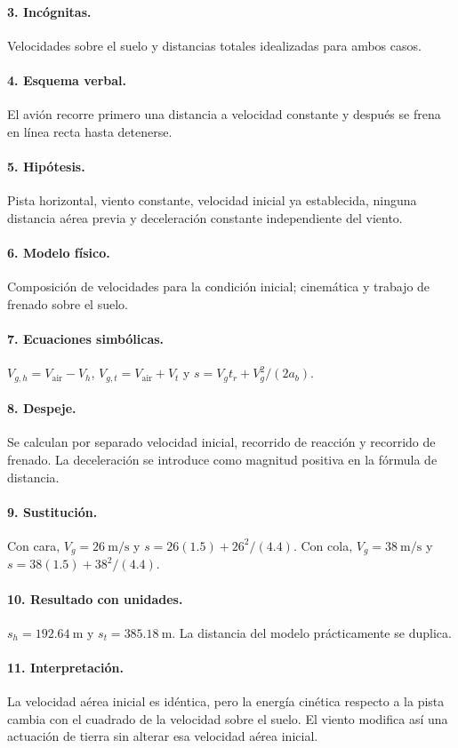 \paragraph{3. Incógnitas.} Velocidades sobre el suelo y distancias totales idealizadas para ambos casos.
\paragraph{4. Esquema verbal.} El avión recorre primero una distancia a velocidad constante y después se frena en línea recta hasta detenerse.
\paragraph{5. Hipótesis.} Pista horizontal, viento constante, velocidad inicial ya establecida, ninguna distancia aérea previa y deceleración constante independiente del viento.
\paragraph{6. Modelo físico.} Composición de velocidades para la condición inicial; cinemática y trabajo de frenado sobre el suelo.
\paragraph{7. Ecuaciones simbólicas.} $V_{g,h}=V_{\mathrm{air}}-V_h$, $V_{g,t}=V_{\mathrm{air}}+V_t$ y $s=V_gt_r+V_g^2/(2a_b)$.
\paragraph{8. Despeje.} Se calculan por separado velocidad inicial, recorrido de reacción y recorrido de frenado. La deceleración se introduce como magnitud positiva en la fórmula de distancia.
\paragraph{9. Sustitución.} Con cara, $V_g=26\ \mathrm{m/s}$ y $s=26(1.5)+26^2/(4.4)$. Con cola, $V_g=38\ \mathrm{m/s}$ y $s=38(1.5)+38^2/(4.4)$.
\paragraph{10. Resultado con unidades.} $s_h=192.64\ \mathrm m$ y $s_t=385.18\ \mathrm m$. La distancia del modelo prácticamente se duplica.
\paragraph{11. Interpretación.} La velocidad aérea inicial es idéntica, pero la energía cinética respecto a la pista cambia con el cuadrado de la velocidad sobre el suelo. El viento modifica así una actuación de tierra sin alterar esa velocidad aérea inicial.
